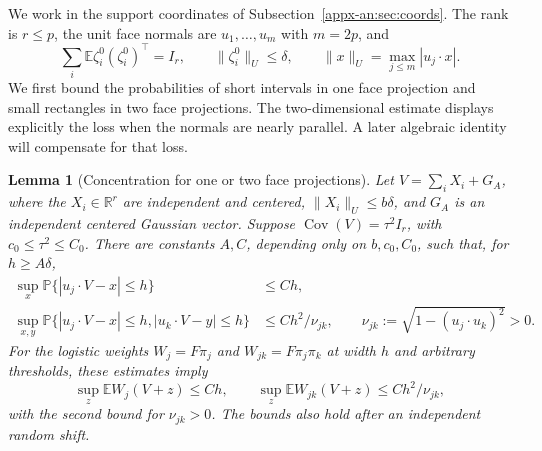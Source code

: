 \documentclass[11pt,letterpaper]{article}
\newtheorem{lemma}{Lemma}
\theoremstyle{remark}
\newcommand{\E}{\mathbb E}
\newcommand{\Pp}{\mathbb P}
\newcommand{\R}{\mathbb R}
\newcommand{\Cov}{\operatorname{Cov}}
\begin{document}
We work in the support coordinates of
Subsection~\ref{appx-an:sec:coords}. The rank is $r\le p$,
the unit face normals are $u_1,\ldots,u_m$ with $m=2p$, and
\[
 \sum_i\E\zeta_i^0(\zeta_i^0)^\top=I_r,
 \qquad \|\zeta_i^0\|_U\le\delta,
 \qquad \|x\|_U=\max_{j\le m}|u_j\cdot x|.
\]
We first bound the probabilities of short intervals in one face
projection and small rectangles in two face projections. The
two-dimensional estimate displays explicitly the loss when the
normals are nearly parallel. A later algebraic identity will
compensate for that loss.

\begin{lemma}[Concentration for one or two face projections]
\label{lem:cap-concentration}
Let $V=\sum_iX_i+G_A$, where the $X_i\in\R^r$ are independent
and centered, $\|X_i\|_U\le b\delta$, and $G_A$ is an
independent centered Gaussian vector. Suppose
$\Cov(V)=\tau^2I_r$, with $c_0\le\tau^2\le C_0$.
There are constants $A,C$, depending only on $b,c_0,C_0$,
such that, for $h\ge A\delta$,
\begin{align}
 \sup_x\Pp\{|u_j\cdot V-x|\le h\}&\le Ch,
 \label{cap:one-concentration}\\
 \sup_{x,y}\Pp\{|u_j\cdot V-x|\le h,
                 |u_k\cdot V-y|\le h\}
 &\le Ch^2/\nu_{jk},\qquad
 \nu_{jk}:=\sqrt{1-(u_j\cdot u_k)^2}>0.
 \label{cap:two-concentration}
\end{align}
For the logistic weights $W_j=F\pi_j$ and $W_{jk}=F\pi_j\pi_k$
at width $h$ and arbitrary thresholds, these estimates imply
\begin{equation}
 \sup_z\E W_j(V+z)\le Ch,\qquad
 \sup_z\E W_{jk}(V+z)\le Ch^2/\nu_{jk},
 \label{cap:weight-concentration}
\end{equation}
with the second bound for $\nu_{jk}>0$.
The bounds also hold after an independent random shift.
\end{lemma}
\end{document}
